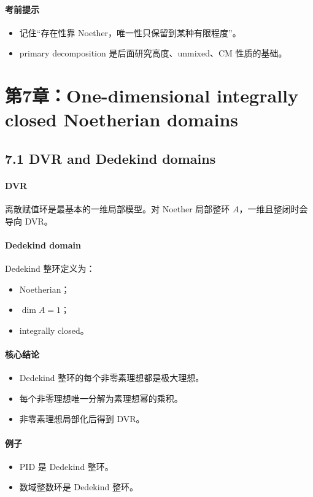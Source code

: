 \documentclass[a4paper]{ctexart}
\begin{document}
\paragraph{考前提示}
\begin{itemize}
  \item 记住“存在性靠 Noether，唯一性只保留到某种有限程度”。
  \item primary decomposition 是后面研究高度、unmixed、CM 性质的基础。
\end{itemize}

\section{第7章：One-dimensional integrally closed Noetherian domains}

\subsection{7.1 DVR and Dedekind domains}

\paragraph{DVR}
离散赋值环是最基本的一维局部模型。对 Noether 局部整环 \(A\)，一维且整闭时会导向 DVR。

\paragraph{Dedekind domain}
Dedekind 整环定义为：
\begin{itemize}
  \item Noetherian；
  \item \(\dim A=1\)；
  \item integrally closed。
\end{itemize}

\paragraph{核心结论}
\begin{itemize}
  \item Dedekind 整环的每个非零素理想都是极大理想。
  \item 每个非零理想唯一分解为素理想幂的乘积。
  \item 非零素理想局部化后得到 DVR。
\end{itemize}

\paragraph{例子}
\begin{itemize}
  \item PID 是 Dedekind 整环。
  \item 数域整数环是 Dedekind 整环。
\end{itemize}
\end{document}

